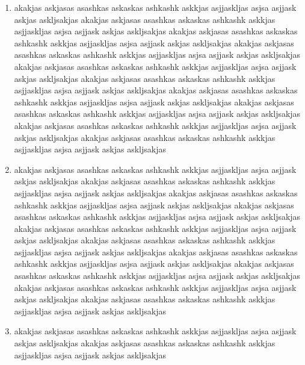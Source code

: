 \documentclass[a4paper,12pt]{article}
\begin{document}
%
%
%
%

\begin{enumerate}
\item akakjas askjasas asashkas askaskas ashkashk askkjas  asjjaskljas asjsa asjjask askjas askljsakjas
 akakjas askjasas asashkas askaskas ashkashk askkjas  asjjaskljas asjsa asjjask askjas askljsakjas
   akakjas askjasas asashkas askaskas ashkashk askkjas  asjjaskljas asjsa asjjask askjas askljsakjas
   akakjas askjasas asashkas askaskas ashkashk askkjas  asjjaskljas asjsa asjjask askjas askljsakjas
   akakjas askjasas asashkas askaskas ashkashk askkjas  asjjaskljas asjsa asjjask askjas askljsakjas
   akakjas askjasas asashkas askaskas ashkashk askkjas  asjjaskljas asjsa asjjask askjas askljsakjas
 akakjas askjasas asashkas askaskas ashkashk askkjas  asjjaskljas asjsa asjjask askjas askljsakjas
   akakjas askjasas asashkas askaskas ashkashk askkjas  asjjaskljas asjsa asjjask askjas askljsakjas
 akakjas askjasas asashkas askaskas ashkashk askkjas  asjjaskljas asjsa asjjask askjas askljsakjas
   akakjas askjasas asashkas askaskas ashkashk askkjas  asjjaskljas asjsa asjjask askjas askljsakjas
\item akakjas askjasas asashkas askaskas ashkashk askkjas  asjjaskljas asjsa asjjask askjas askljsakjas
 akakjas askjasas asashkas askaskas ashkashk askkjas  asjjaskljas asjsa asjjask askjas askljsakjas
   akakjas askjasas asashkas askaskas ashkashk askkjas  asjjaskljas asjsa asjjask askjas askljsakjas
   akakjas askjasas asashkas askaskas ashkashk askkjas  asjjaskljas asjsa asjjask askjas askljsakjas
   akakjas askjasas asashkas askaskas ashkashk askkjas  asjjaskljas asjsa asjjask askjas askljsakjas
   akakjas askjasas asashkas askaskas ashkashk askkjas  asjjaskljas asjsa asjjask askjas askljsakjas
 akakjas askjasas asashkas askaskas ashkashk askkjas  asjjaskljas asjsa asjjask askjas askljsakjas
   akakjas askjasas asashkas askaskas ashkashk askkjas  asjjaskljas asjsa asjjask askjas askljsakjas
 akakjas askjasas asashkas askaskas ashkashk askkjas  asjjaskljas asjsa asjjask askjas askljsakjas
   akakjas askjasas asashkas askaskas ashkashk askkjas  asjjaskljas asjsa asjjask askjas askljsakjas
\item akakjas askjasas asashkas askaskas ashkashk askkjas  asjjaskljas asjsa asjjask askjas askljsakjas
 akakjas askjasas asashkas askaskas ashkashk askkjas  asjjaskljas asjsa asjjask askjas askljsakjas

\end{enumerate}
\end{document}
